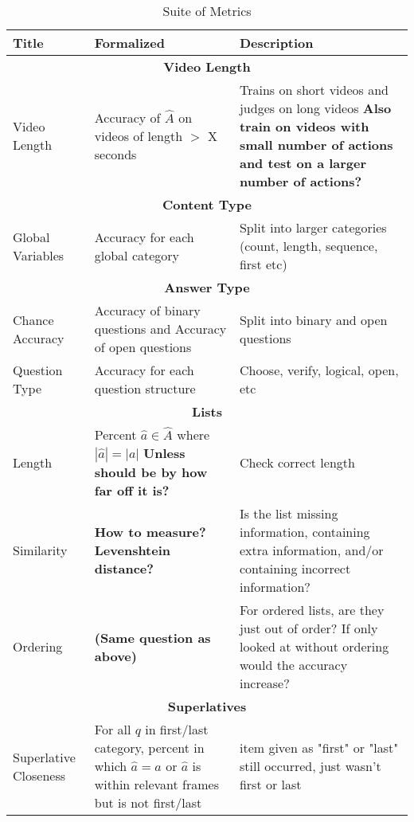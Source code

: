 \documentclass{article}
\begin{document}
\begin{longtable}[]{|p{2cm}|p{4cm}|p{10cm}|}
    \caption{Suite of Metrics}
    \label{tab:table1}
        \hline
        \textbf{Title} & \textbf{Formalized} & \textbf{Description}\\
        \hline
        \multicolumn{3}{|c|}{\textbf{Video Length}}\\
        \hline
        Video Length & Accuracy of $\hat{A}$ on videos of length $>$ X seconds & Trains on short videos and judges on long videos \textbf{Also train on videos with small number of actions and test on a larger number of actions? } \\
        \hline
        \multicolumn{3}{|c|}{\textbf{Content Type}}\\
        \hline
        Global Variables & Accuracy for each global category & Split into larger categories (count, length, sequence, first etc)\\
        \hline
        \multicolumn{3}{|c|}{\textbf{Answer Type}}\\
        \hline
        Chance Accuracy & Accuracy of binary questions and Accuracy of open questions & Split into binary and open questions\\
        \hline
        Question Type & Accuracy for each question structure  & Choose, verify, logical, open, etc\\
        \hline
        \multicolumn{3}{|c|}{\textbf{Lists}}\\
        \hline
        Length & Percent $\hat{a} \in \hat{A}$ where $|\hat{a}| = |a|$ \textbf{Unless should be by how far off it is?} & Check correct length\\
        \hline 
        Similarity & \textbf{How to measure? Levenshtein distance?} & Is the list missing information, containing extra information, and/or containing incorrect information? \\
        \hline
        Ordering & \textbf{(Same question as above)} & For ordered lists, are they just out of order? If only looked at without ordering would the accuracy increase? \\
        \hline
        \multicolumn{3}{|c|}{\textbf{Superlatives}}\\
        \hline
        Superlative Closeness & For all $q$ in first/last category, percent in which $\hat{a} = a$ or $\hat{a}$ is within relevant frames but is not first/last & item given as "first" or "last" still occurred, just wasn't first or last \\

\end{longtable}
\end{document}

